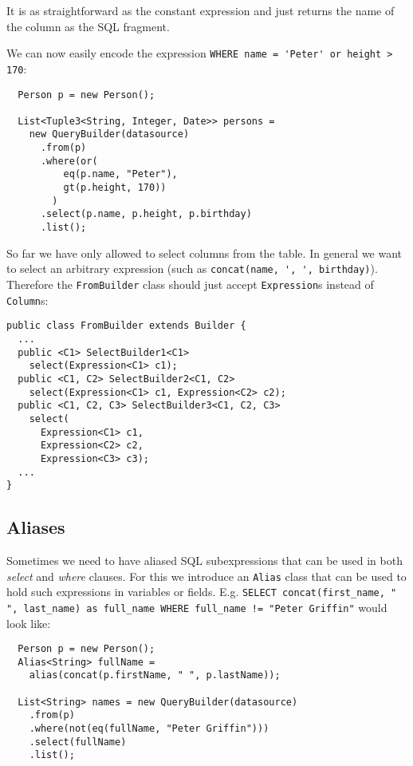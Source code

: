 \documentclass{sig-alternate}
\begin{document}
It is as straightforward as the constant expression and just returns the name of the column as the SQL fragment.

We can now easily encode the expression \verb!WHERE name = 'Peter' or height > 170!:

\begin{verbatim}
  Person p = new Person();
		
  List<Tuple3<String, Integer, Date>> persons =
    new QueryBuilder(datasource)
      .from(p)
      .where(or(
          eq(p.name, "Peter"),
          gt(p.height, 170))
        )
      .select(p.name, p.height, p.birthday)
      .list();
\end{verbatim}


So far we have only allowed to select columns from the table. In general we want to select an arbitrary expression (such as \verb!concat(name, ', ', birthday)!). Therefore the \verb!FromBuilder! class should just accept \verb!Expression!s instead of \verb!Column!s:

\begin{verbatim}
public class FromBuilder extends Builder {
  ...
  public <C1> SelectBuilder1<C1> 
    select(Expression<C1> c1);
  public <C1, C2> SelectBuilder2<C1, C2> 
    select(Expression<C1> c1, Expression<C2> c2);
  public <C1, C2, C3> SelectBuilder3<C1, C2, C3> 
    select(
      Expression<C1> c1, 
      Expression<C2> c2, 
      Expression<C3> c3);
  ...
}
\end{verbatim}

\subsection{Aliases}

Sometimes we need to have aliased SQL subexpressions that can be used in both \emph{select} and \emph{where} clauses. For this we introduce an \verb!Alias! class that can be used to hold such expressions in variables or fields. E.g. \texttt{SELECT concat(first\_name, " ", last\_name) as full\_name WHERE full\_name != "Peter Griffin"} would look like:

\begin{verbatim}
  Person p = new Person();
  Alias<String> fullName =
    alias(concat(p.firstName, " ", p.lastName));
		
  List<String> names = new QueryBuilder(datasource)
    .from(p)
    .where(not(eq(fullName, "Peter Griffin")))
    .select(fullName)
    .list();
\end{verbatim}
\end{document}
